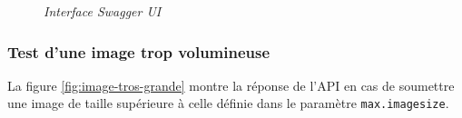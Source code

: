 \documentclass[12pt,a4paper]{report}
\begin{document}
	\begin{figure}[H]
		\centering
		\caption{\textit{Interface Swagger UI}}
		\label{fig:swagger-ui}
	\end{figure}
	
	\subsubsection{Test d'une image trop volumineuse}
	
	La figure \ref{fig:image-tros-grande} montre la réponse de l'API en cas de soumettre une image de taille supérieure à celle définie dans le paramètre \verb|max.imagesize|.
	
\end{document}
